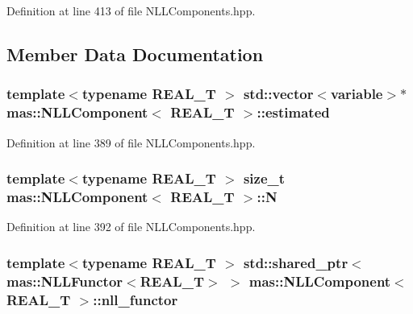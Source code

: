 Definition at line 413 of file N\-L\-L\-Components.\-hpp.



\subsection{Member Data Documentation}
\hypertarget{structmas_1_1_n_l_l_component_a1d5439e34e306b6d3cfabfa7511f4885}{
\subsubsection[{estimated}]{\setlength{\rightskip}{0pt plus 5cm}template$<$typename R\-E\-A\-L\-\_\-\-T $>$ std\-::vector$<${\bf variable}$>$$\ast$ {\bf mas\-::\-N\-L\-L\-Component}$<$ R\-E\-A\-L\-\_\-\-T $>$\-::estimated}}\label{structmas_1_1_n_l_l_component_a1d5439e34e306b6d3cfabfa7511f4885}


Definition at line 389 of file N\-L\-L\-Components.\-hpp.

\hypertarget{structmas_1_1_n_l_l_component_ae00089e4495dceff480b3e5d757a28c8}{
\subsubsection[{N}]{\setlength{\rightskip}{0pt plus 5cm}template$<$typename R\-E\-A\-L\-\_\-\-T $>$ size\-\_\-t {\bf mas\-::\-N\-L\-L\-Component}$<$ R\-E\-A\-L\-\_\-\-T $>$\-::N}}\label{structmas_1_1_n_l_l_component_ae00089e4495dceff480b3e5d757a28c8}


Definition at line 392 of file N\-L\-L\-Components.\-hpp.

\hypertarget{structmas_1_1_n_l_l_component_aac558bbcbc7a6d23b86b59bde0b2feed}{
\subsubsection[{nll\-\_\-functor}]{\setlength{\rightskip}{0pt plus 5cm}template$<$typename R\-E\-A\-L\-\_\-\-T $>$ std\-::shared\-\_\-ptr$<${\bf mas\-::\-N\-L\-L\-Functor}$<$R\-E\-A\-L\-\_\-\-T$>$ $>$ {\bf mas\-::\-N\-L\-L\-Component}$<$ R\-E\-A\-L\-\_\-\-T $>$\-::nll\-\_\-functor}}\label{structmas_1_1_n_l_l_component_aac558bbcbc7a6d23b86b59bde0b2feed}


